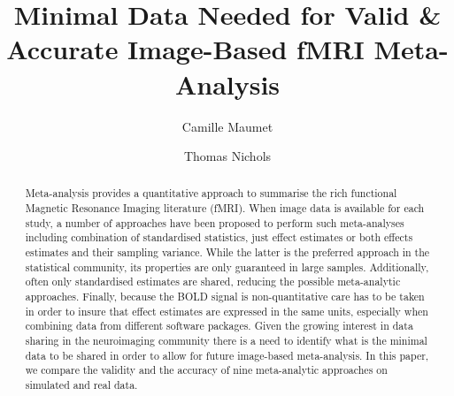 \documentclass[preprint]{elsarticle}
\begin{document}
\begin{frontmatter}


\title{Minimal Data Needed for Valid \& Accurate Image-Based fMRI Meta-Analysis}




\author{Camille Maumet}
\author{Thomas Nichols}

\address{Oxford Big Data Institute, Li Ka Shing Centre for Health Information and Discovery, Nuffield Department of Population Health, University of Oxford, Oxford, UK}
\address{Statistics Department, University of Warwick, Coventry, UK.}

\begin{abstract}
Meta-analysis provides a quantitative approach to summarise the rich functional Magnetic Resonance Imaging literature (fMRI). When image data is available for each study, a number of approaches have been proposed to perform such meta-analyses including combination of standardised statistics, just effect estimates or both effects estimates and their sampling variance. While the latter is the preferred approach in the statistical community, its properties are only guaranteed in large samples. Additionally, often only standardised estimates are shared, reducing the possible meta-analytic approaches. Finally, because the BOLD signal is non-quantitative care has to be taken in order to insure that effect estimates are expressed in the same units, especially when combining data from different software packages. Given the growing interest in data sharing in the neuroimaging community there is a need to identify what is the minimal data to be shared in order to allow for future image-based meta-analysis. In this paper, we compare the validity and the accuracy of nine meta-analytic approaches on simulated and real data. 


\end{abstract}
\end{frontmatter}
\end{document}
